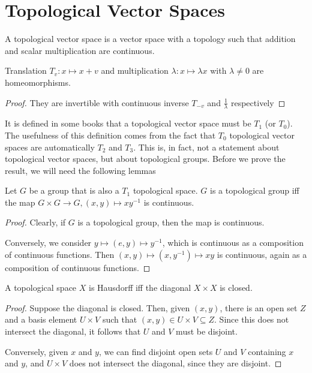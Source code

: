 \documentclass[twoside,symmetric, openany, 12pt]{./tuftebook}
\theoremstyle{definition}
\theoremstyle{definition}
\theoremstyle{definition}
\begin{document}
	\chapter{Topological Vector Spaces}
	\begin{Definition}
		A topological vector space is a vector space with a topology such that addition and scalar multiplication are continuous.
	\end{Definition}
	\begin{Theorem}
		Translation $T_v:x\mapsto x + v$ and multiplication $\lambda: x \mapsto \lambda x$ with $\lambda\neq0$ are homeomorphisms.
	\end{Theorem}
	\begin{proof}
		They are invertible with continuous inverse $T_{-v}$ and $\frac 1\lambda$ respectively
	\end{proof}
	It is defined in some books that a topological vector space must be $T_1$ (or $T_0$). The usefulness of this definition comes from the fact that $T_0$ topological vector spaces are automatically $T_2$ and $T_3$. This is, in fact, not a statement about topological vector spaces, but about topological groups. Before we prove the result, we will need the following lemmas
	\begin{Lemma}
		Let $G$ be a group that is also a $T_1$ topological space. $G$ is a topological group iff the map $G \times G \to G, (x,y)\mapsto xy^{-1}$ is continuous.
	\end{Lemma}
\begin{proof}
	Clearly, if $G$ is a topological group, then the map is continuous. 
	
	Conversely, we consider $y \mapsto (e,y) \mapsto y^{-1}$, which is continuous as a composition of continuous functions. Then $(x,y) \mapsto (x, y^{-1}) \mapsto xy$ is continuous, again as a composition of continuous functions.
\end{proof}
\begin{Lemma}
	A topological space $X$ is Hausdorff iff the diagonal $X\times X$ is closed.
\end{Lemma}
\begin{proof}
	Suppose the diagonal is closed. Then, given $(x,y)$, there is an open set $Z$ and a basis element $U\times V$ such that $(x,y)\in U\times V \subseteq Z$. Since this does not intersect the diagonal, it follows that $U$ and $V$ must be disjoint.
	
	Conversely, given $x$ and $y$, we can find disjoint open sets $U$ and $V$ containing $x$ and $y$, and $U\times V$ does not intersect the diagonal, since they are disjoint. 
\end{proof}
\end{document}
